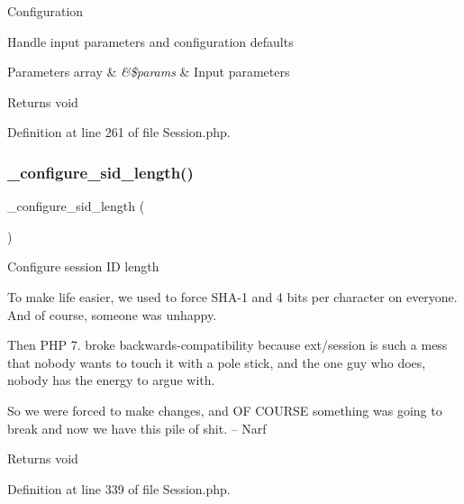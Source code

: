 Configuration

Handle input parameters and configuration defaults


\begin{DoxyParams}[1]{Parameters}
array & {\em \&\$params} & Input parameters \\
\hline
\end{DoxyParams}
\begin{DoxyReturn}{Returns}
void 
\end{DoxyReturn}


Definition at line 261 of file Session.\+php.

\mbox{\label{class_c_i___session_af85033c81c047ceeec26aa087d5ba459}} 
\subsubsection{\texorpdfstring{\_configure\_sid\_length()}{\_configure\_sid\_length()}}
{\footnotesize\ttfamily \+\_\+configure\+\_\+sid\+\_\+length (\begin{DoxyParamCaption}{ }\end{DoxyParamCaption})\hspace{0.3cm}{\ttfamily [protected]}}

Configure session ID length

To make life easier, we used to force S\+H\+A-\/1 and 4 bits per character on everyone. And of course, someone was unhappy.

Then P\+HP 7. broke backwards-\/compatibility because ext/session is such a mess that nobody wants to touch it with a pole stick, and the one guy who does, nobody has the energy to argue with.

So we were forced to make changes, and OF C\+O\+U\+R\+SE something was going to break and now we have this pile of shit. -- Narf

\begin{DoxyReturn}{Returns}
void 
\end{DoxyReturn}


Definition at line 339 of file Session.\+php.

\mbox{\label{class_c_i___session_a974fa60ddc074b14ffcc78ef9902bc5c}} 
